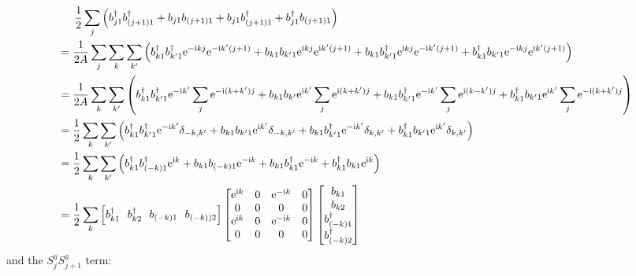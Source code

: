 \documentclass[letter]{article}
\newcommand{\e}{\mathrm{e}}
\newcommand{\ii}{\mathrm{i}}
\begin{document}
$$\begin{aligned}
    & \indent  \frac{1}{2}\sum_{j}\left(b_{j1}^{\dagger}b_{(j+1)1}^{\dagger}+b_{j1}b_{(j+1)1}+b_{j1}b_{(j+1)1}^{\dagger}+b_{j1}^{\dagger}b_{(j+1)1}\right)\\
    &=\frac{1}{2A}\sum_{j}\sum_{k}\sum_{k'}\left(b_{k1}^{\dagger}b_{k'1}^{\dagger}\e^{-\ii kj}\e^{-\ii k'(j+1)}+b_{k1}b_{k'1}\e^{\ii kj}\e^{\ii k'(j+1)}+b_{k1}b_{k'1}^{\dagger}\e^{\ii kj}\e^{-\ii k'(j+1)}+b_{k1}^{\dagger}b_{k'1}\e^{-\ii kj}\e^{\ii k'(j+1)}\right)\\
    &=\frac{1}{2A}\sum_{k}\sum_{k'}\left(b_{k1}^{\dagger}b_{k'1}^{\dagger}\e^{-\ii k'}\sum_j \e^{-\ii (k+k')j}+b_{k1}b_{k'}\e^{\ii k'}\sum_j \e^{\ii (k+k')j}+b_{k1}b_{k'1}^{\dagger}\e^{-\ii k'}\sum_j \e^{\ii (k-k')j}+b_{k1}^{\dagger}b_{k'1}\e^{\ii k'}\sum_j \e^{-\ii (k+k')j}\right)\\
    &=\frac{1}{2}\sum_k\sum_{k'}\left(b_{k1}^{\dagger}b_{k'1}^{\dagger}\e^{-\ii k'}\delta_{-k,k'}+b_{k1}b_{k'1}\e^{\ii k'}\delta_{-k,k'}+b_{k1}b_{k'1}^{\dagger}\e^{-\ii k'}\delta_{k,k'}+b_{k1}^{\dagger}b_{k'1}\e^{\ii k'}\delta_{k,k'}\right)\\
    &=\frac{1}{2}\sum_k\sum_{k'}\left(b_{k1}^{\dagger}b_{(-k)1}^{\dagger}\e^{\ii k}+b_{k1}b_{(-k)1}\e^{-\ii k}+b_{k1}b_{k1}^{\dagger}\e^{-\ii k}+b_{k1}^{\dagger}b_{k1}\e^{\ii k}\right)\\
    &=\frac{1}{2}\sum_k \left[
      b_{k1}^{\dagger} \ \ 
      b_{k2}^{\dagger}\  \ 
      b_{(-k)1}\ \ 
      b_{(-k))2}\right]
     \begin{bmatrix}
          \e^{\ii k} & 0 & \e^{-\ii k} & 0 \\
         0 &  0 & 0 &0 \\
         \e^{\ii k} &  0 & \e^{-\ii k} &0\\
          0 & 0 & 0& 0
          \end{bmatrix}\begin{bmatrix}
              b_{k1}  \\
              b_{k2}  \\
              b_{(-k)1}^{\dagger}\\
              b_{(-k)2}^{\dagger}
              \end{bmatrix}
  \end{aligned}
  $$
  and the $S_j^y S_{j+1}^y$ term:
\end{document}
